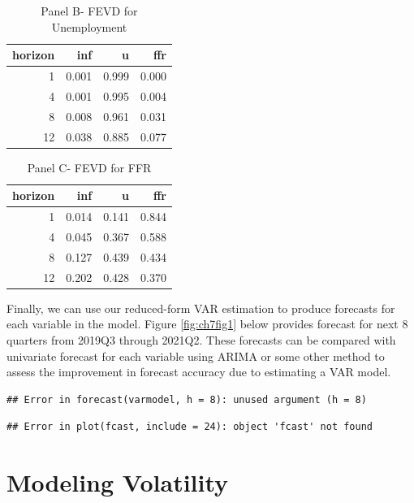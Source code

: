 \documentclass[]{book}
\theoremstyle{definition}
\theoremstyle{definition}
\theoremstyle{definition}
\theoremstyle{remark}
\begin{document}
\begin{table}[t]

\caption{\label{tab:unnamed-chunk-13}Panel B- FEVD for Unemployment}
\centering
\begin{tabular}{r|r|r|r}
\hline
horizon & inf & u & ffr\\
\hline
1 & 0.001 & 0.999 & 0.000\\
\hline
4 & 0.001 & 0.995 & 0.004\\
\hline
8 & 0.008 & 0.961 & 0.031\\
\hline
12 & 0.038 & 0.885 & 0.077\\
\hline
\end{tabular}
\end{table}

\begin{table}[t]

\caption{\label{tab:unnamed-chunk-13}Panel C- FEVD for FFR}
\centering
\begin{tabular}{r|r|r|r}
\hline
horizon & inf & u & ffr\\
\hline
1 & 0.014 & 0.141 & 0.844\\
\hline
4 & 0.045 & 0.367 & 0.588\\
\hline
8 & 0.127 & 0.439 & 0.434\\
\hline
12 & 0.202 & 0.428 & 0.370\\
\hline
\end{tabular}
\end{table}

Finally, we can use our reduced-form VAR estimation to produce forecasts for each variable in the model.
Figure \ref{fig:ch7fig1} below provides forecast for next 8 quarters from 2019Q3 through 2021Q2. These forecasts can be compared with univariate forecast for each variable using ARIMA or some other method to assess the improvement in forecast accuracy due to estimating a VAR model.

\begin{verbatim}
## Error in forecast(varmodel, h = 8): unused argument (h = 8)
\end{verbatim}

\begin{verbatim}
## Error in plot(fcast, include = 24): object 'fcast' not found
\end{verbatim}

\hypertarget{modeling-volatility}{%
\chapter{Modeling Volatility}\label{modeling-volatility}}
\end{document}
